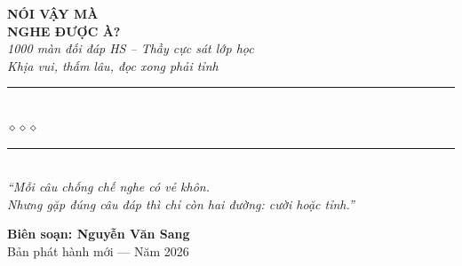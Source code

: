 \begin{titlepage}
\begin{center}
  {\fontsize{31}{37}\selectfont\bfseries\color{inkdark!90!black}
    NÓI VẬY MÀ}\\[0.3cm]
  {\fontsize{35}{41}\selectfont\bfseries\color{sunclay!88!black}
    NGHE ĐƯỢC À?}\\[0.55cm]

  {\fontsize{16}{20}\selectfont\color{sunclay!95!black}\itshape
    1000 màn đối đáp HS -- Thầy cực sát lớp học\\
    Khịa vui, thấm lâu, đọc xong phải tỉnh}\\[1cm]

  {\color{chalkgreen!60}\rule{6cm}{1pt}}\\[5pt]
  {\color{sunclay!80!black}\large$\diamond$\hspace{1cm}$\diamond$\hspace{1cm}$\diamond$}\\[5pt]
  {\color{chalkgreen!60}\rule{6cm}{1pt}}\\[1.3cm]

  {\normalsize\itshape\color{chalkgreen!92!black}
   ``Mỗi câu chống chế nghe có vẻ khôn.\\
   Nhưng gặp đúng câu đáp thì chỉ còn hai đường: cười hoặc tỉnh.''}

  \vfill

  {\fontsize{16}{20}\selectfont\bfseries\color{chalkgreen!90!black}
    Biên soạn: \textbf{Nguyễn Văn Sang}}\\[0.35cm]

  {\small\color{gray} Bản phát hành mới --- Năm 2026}\\[0.5cm]
\end{center}

\afterpage{\nopagecolor}
\end{titlepage}